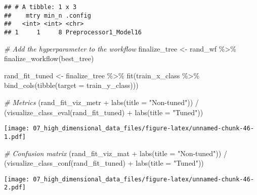\documentclass[
]{book}
\newenvironment{Shaded}{\begin{snugshade}}{\end{snugshade}}
\newcommand{\AttributeTok}[1]{\textcolor[rgb]{0.77,0.63,0.00}{#1}}
\newcommand{\CommentTok}[1]{\textcolor[rgb]{0.56,0.35,0.01}{\textit{#1}}}
\newcommand{\FunctionTok}[1]{\textcolor[rgb]{0.00,0.00,0.00}{#1}}
\newcommand{\NormalTok}[1]{#1}
\newcommand{\OtherTok}[1]{\textcolor[rgb]{0.56,0.35,0.01}{#1}}
\newcommand{\SpecialCharTok}[1]{\textcolor[rgb]{0.00,0.00,0.00}{#1}}
\newcommand{\StringTok}[1]{\textcolor[rgb]{0.31,0.60,0.02}{#1}}
\begin{document}
\begin{verbatim}
## # A tibble: 1 x 3
##    mtry min_n .config              
##   <int> <int> <chr>                
## 1     1     8 Preprocessor1_Model16
\end{verbatim}

\begin{Shaded}
\begin{Highlighting}[]
\CommentTok{\# Add the hyperparameter to the workflow }
\NormalTok{finalize\_tree }\OtherTok{\textless{}{-}}\NormalTok{ rand\_wf }\SpecialCharTok{\%\textgreater{}\%}
  \FunctionTok{finalize\_workflow}\NormalTok{(best\_tree)}
\end{Highlighting}
\end{Shaded}

\begin{Shaded}
\begin{Highlighting}[]
\NormalTok{rand\_fit\_tuned }\OtherTok{\textless{}{-}}\NormalTok{ finalize\_tree }\SpecialCharTok{\%\textgreater{}\%} 
  \FunctionTok{fit}\NormalTok{(train\_x\_class }\SpecialCharTok{\%\textgreater{}\%} \FunctionTok{bind\_cols}\NormalTok{(}\FunctionTok{tibble}\NormalTok{(}\AttributeTok{target =}\NormalTok{ train\_y\_class)))}

\CommentTok{\# Metrics }
\NormalTok{(rand\_fit\_viz\_metr }\SpecialCharTok{+} \FunctionTok{labs}\NormalTok{(}\AttributeTok{title =} \StringTok{"Non{-}tuned"}\NormalTok{)) }\SpecialCharTok{/}\NormalTok{ (}\FunctionTok{visualize\_class\_eval}\NormalTok{(rand\_fit\_tuned) }\SpecialCharTok{+} \FunctionTok{labs}\NormalTok{(}\AttributeTok{title =} \StringTok{"Tuned"}\NormalTok{))}
\end{Highlighting}
\end{Shaded}

\texttt{[image: 07\_high\_dimensional\_data\_files/figure-latex/unnamed-chunk-46-1.pdf]}

\begin{Shaded}
\begin{Highlighting}[]
\CommentTok{\# Confusion matrix }
\NormalTok{(rand\_fit\_viz\_mat }\SpecialCharTok{+} \FunctionTok{labs}\NormalTok{(}\AttributeTok{title =} \StringTok{"Non{-}tuned"}\NormalTok{)) }\SpecialCharTok{/}\NormalTok{ (}\FunctionTok{visualize\_class\_conf}\NormalTok{(rand\_fit\_tuned) }\SpecialCharTok{+} \FunctionTok{labs}\NormalTok{(}\AttributeTok{title =} \StringTok{"Tuned"}\NormalTok{))}
\end{Highlighting}
\end{Shaded}

\texttt{[image: 07\_high\_dimensional\_data\_files/figure-latex/unnamed-chunk-46-2.pdf]}
\end{document}
